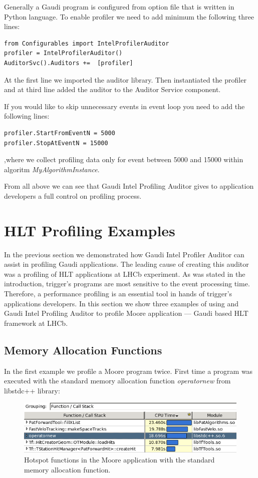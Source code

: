 \documentclass[a4paper]{jpconf}
\begin{document}
Generally a Gaudi program is configured from option file that is written in Python language. To enable profiler we need to add minimum the following three lines:
\begin{verbatim}
from Configurables import IntelProfilerAuditor
profiler = IntelProfilerAuditor()
AuditorSvc().Auditors +=  [profiler]
\end{verbatim}

At the first line we imported the auditor library. Then instantiated the profiler and at third line added the auditor to the Auditor Service component.

If you would like to skip unnecessary events in event loop you need to add the following lines:
\begin{verbatim}
profiler.StartFromEventN = 5000 
profiler.StopAtEventN = 15000
\end{verbatim}
,where we collect profiling data only for event between 5000 and 15000 within algoritm {\it MyAlgorithmInstance}.


From all above we can see that Gaudi Intel Profiling Auditor gives to application developers a full control on profiling process.


\section{HLT Profiling Examples}

In the previous section we demonstrated how Gaudi Intel Profiler Auditor can assist  in profiling Gaudi applications. The leading cause of  creating this auditor was a profiling of HLT applications at LHCb experiment. As was stated in the introduction, trigger’s programs are most sensitive to the event processing time. Therefore, a performance profiling is an essential tool in hands of trigger’s applications developers. In this section we show three examples of using \amp and Gaudi Intel Profiling Auditor to profile Moore application --- Gaudi based HLT framework at LHCb. 

\subsection{Memory Allocation Functions}

In the first example we profile a Moore program twice. First time a program was executed with the standard memory allocation function {\it operatornew} from libstdc++ library: 

\begin{figure}[H]
\begin{minipage}{\textwidth}
\includegraphics[width=\textwidth]{figs/fig10.png}
\caption{\label{fig10}Hotspot functions in the Moore application with the standard memory allocation function.}
\end{minipage}
\end{figure}
\end{document}
